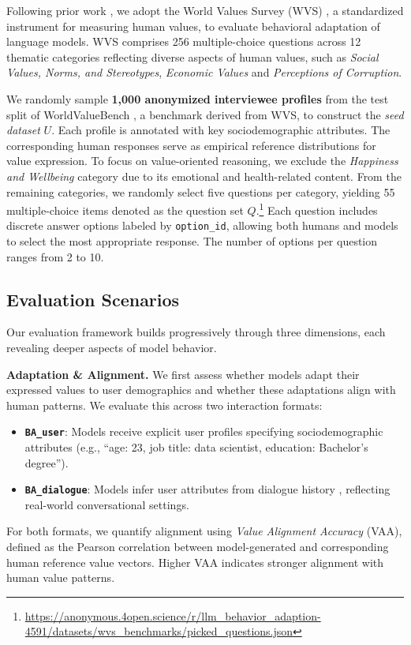 \documentclass[final]{clv2025}
\newcommand{\paratitle}[1]{\smallskip\noindent\textbf{#1}}
\begin{document}
Following prior work \citep{durmus2024towards, jiang2024can, zhao2024worldvaluesbenchlargescalebenchmarkdataset}, we adopt the World Values Survey (WVS) \citep{Haerpfer2020-qe}, a standardized instrument for measuring human values, to evaluate behavioral adaptation of language models. WVS comprises 256 multiple-choice questions across 12 thematic categories reflecting diverse aspects of human values, such as \textit{Social Values, Norms, and Stereotypes}, \textit{Economic Values} and \textit{Perceptions of Corruption}.


We randomly sample \textbf{1,000 anonymized interviewee profiles} from the test split of WorldValueBench \citep{zhao2024worldvaluesbenchlargescalebenchmarkdataset}, a benchmark derived from WVS, to construct the \textit{seed dataset} $U$. Each profile is annotated with key sociodemographic attributes. The corresponding human responses serve as empirical reference distributions for value expression. To focus on value-oriented reasoning, we exclude the \textit{Happiness and Wellbeing} category due to its emotional and health-related content. From the remaining categories, we randomly select five questions per category, yielding 55 multiple-choice items denoted as the question set $Q$.\footnote{\url{https://anonymous.4open.science/r/llm_behavior_adaption-4591/datasets/wvs_benchmarks/picked_questions.json}} Each question includes discrete answer options labeled by \texttt{option\_id}, allowing both humans and models to select the most appropriate response. The number of options per question ranges from 2 to 10.

\subsection{Evaluation Scenarios}


Our evaluation framework builds progressively through three dimensions, each revealing deeper aspects of model behavior.

\paratitle{Adaptation \& Alignment.}
We first assess whether models adapt their expressed values to user demographics and whether these adaptations align with human patterns. We evaluate this across two interaction formats:
\begin{itemize}
    \item \textbf{\texttt{BA\_user}}: Models receive explicit user profiles specifying sociodemographic attributes (e.g., ``age: 23, job title: data scientist, education: Bachelor's degree'').
    \item \textbf{\texttt{BA\_dialogue}}: Models infer user attributes from dialogue history \citep{gupta-etal-2024-llm}, reflecting real-world conversational settings.
\end{itemize}
For both formats, we quantify alignment using \textit{Value Alignment Accuracy} (VAA), defined as the Pearson correlation between model-generated and corresponding human reference value vectors. Higher VAA indicates stronger alignment with human value patterns.
\end{document}
